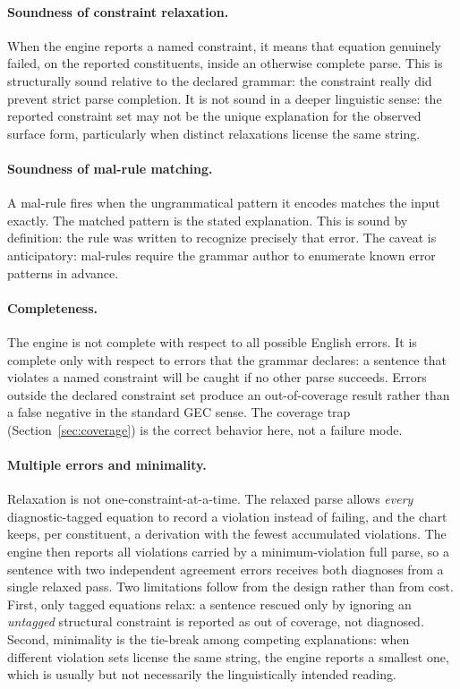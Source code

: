 \documentclass[11pt]{article}
\theoremstyle{definition}
\theoremstyle{plain}
\theoremstyle{remark}
\begin{document}
\paragraph{Soundness of constraint relaxation.}
When the engine reports a named constraint, it means that equation genuinely
failed, on the reported constituents, inside an otherwise complete parse. This
is structurally sound relative to the declared grammar: the constraint really
did prevent strict parse completion. It is not sound in a deeper linguistic
sense: the reported constraint set may not be the unique explanation for the
observed surface form, particularly when distinct relaxations license the same
string.

\paragraph{Soundness of mal-rule matching.}
A mal-rule fires when the ungrammatical pattern it encodes matches the input exactly. The
matched pattern is the stated explanation. This is sound by definition: the rule was
written to recognize precisely that error. The caveat is anticipatory: mal-rules require
the grammar author to enumerate known error patterns in advance.

\paragraph{Completeness.}
The engine is not complete with respect to all possible English errors. It is complete
only with respect to errors that the grammar declares: a sentence that violates a named
constraint will be caught if no other parse succeeds. Errors outside the declared
constraint set produce an out-of-coverage result rather than a false negative in the
standard GEC sense. The coverage trap (Section~\ref{sec:coverage}) is the correct
behavior here, not a failure mode.

\paragraph{Multiple errors and minimality.}
Relaxation is not one-constraint-at-a-time. The relaxed parse allows
\emph{every} diagnostic-tagged equation to record a violation instead of
failing, and the chart keeps, per constituent, a derivation with the fewest
accumulated violations. The engine then reports all violations carried by a
minimum-violation full parse, so a sentence with two independent agreement
errors receives both diagnoses from a single relaxed pass. Two limitations
follow from the design rather than from cost. First, only tagged equations
relax: a sentence rescued only by ignoring an \emph{untagged} structural
constraint is reported as out of coverage, not diagnosed. Second, minimality is
the tie-break among competing explanations: when different violation sets
license the same string, the engine reports a smallest one, which is usually
but not necessarily the linguistically intended reading.
\end{document}
